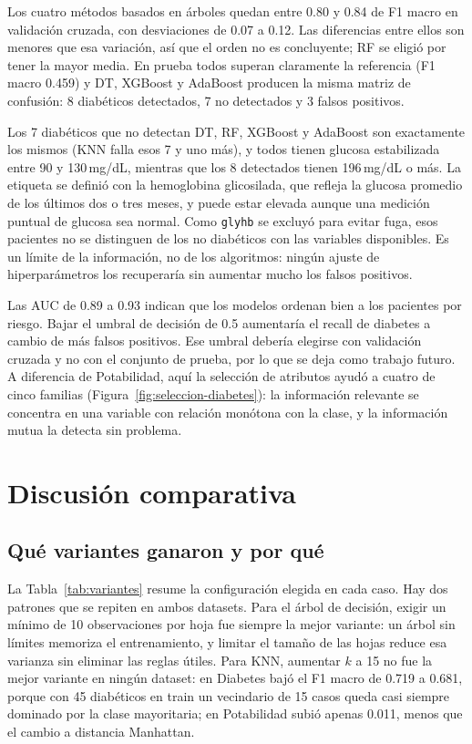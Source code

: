 \documentclass[11pt]{article}
\begin{document}
Los cuatro métodos basados en árboles quedan entre 0.80 y 0.84 de F1 macro en
validación cruzada, con desviaciones de 0.07 a 0.12. Las diferencias entre ellos son
menores que esa variación, así que el orden no es concluyente; RF se eligió por tener
la mayor media. En prueba todos superan claramente la referencia (F1 macro 0.459) y DT,
XGBoost y AdaBoost producen la misma matriz de confusión: 8 diabéticos detectados, 7 no
detectados y 3 falsos positivos.

Los 7 diabéticos que no detectan DT, RF, XGBoost y AdaBoost son exactamente los mismos
(KNN falla esos 7 y uno más), y todos tienen glucosa estabilizada entre 90 y 130\,mg/dL, mientras que los 8 detectados
tienen 196\,mg/dL o más. La etiqueta se definió con la hemoglobina glicosilada, que
refleja la glucosa promedio de los últimos dos o tres meses, y puede estar elevada
aunque una medición puntual de glucosa sea normal. Como \texttt{glyhb} se excluyó para
evitar fuga, esos pacientes no se distinguen de los no diabéticos con las variables
disponibles. Es un límite de la información, no de los algoritmos: ningún ajuste de
hiperparámetros los recuperaría sin aumentar mucho los falsos positivos.

Las AUC de 0.89 a 0.93 indican que los modelos ordenan bien a los pacientes por riesgo.
Bajar el umbral de decisión de 0.5 aumentaría el recall de diabetes a cambio de más
falsos positivos. Ese umbral debería elegirse con validación cruzada y no con el
conjunto de prueba, por lo que se deja como trabajo futuro. A diferencia de
Potabilidad, aquí la selección de atributos ayudó a cuatro de cinco familias
(Figura~\ref{fig:seleccion-diabetes}): la información relevante se concentra en una
variable con relación monótona con la clase, y la información mutua la detecta sin
problema.

\FloatBarrier

\clearpage

\section{Discusión comparativa}

\subsection{Qué variantes ganaron y por qué}
La Tabla~\ref{tab:variantes} resume la configuración elegida en cada caso. Hay dos
patrones que se repiten en ambos datasets. Para el árbol de decisión, exigir un mínimo
de 10 observaciones por hoja fue siempre la mejor variante: un árbol sin límites
memoriza el entrenamiento, y limitar el tamaño de las hojas reduce esa varianza sin
eliminar las reglas útiles. Para KNN, aumentar $k$ a 15 no fue la mejor variante en
ningún dataset: en Diabetes bajó el F1 macro de 0.719 a 0.681, porque con 45 diabéticos
en train un vecindario de 15 casos queda casi siempre dominado por la clase mayoritaria;
en Potabilidad subió apenas 0.011, menos que el cambio a distancia Manhattan.
\end{document}
